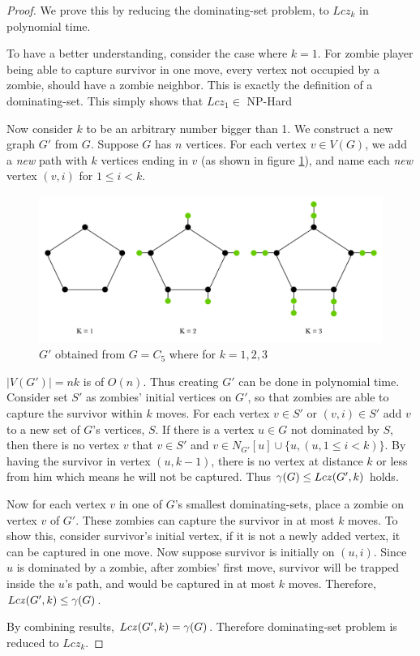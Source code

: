 \documentclass[1p]{elsarticle}
\newcommand{\zn}{\ooalign{$z$\cr\hfil\rule[.5ex]{.2em}{.08ex}\hfil\cr}}
\begin{document}
	\begin{proof}
		We prove this by reducing the dominating-set problem, to $Lcz_k$ in polynomial time.

		To have a better understanding, consider the case where $k=1$. For zombie player being able to capture survivor in
		one move, every vertex not occupied by a zombie, should have a zombie neighbor. This is exactly the definition
		of a dominating-set. This simply shows that $Lcz_1 \in$ NP-Hard 

		Now consider $k$ to be an arbitrary number bigger than 1. We construct a new graph $G'$ from $G$. Suppose $G$
		has $n$ vertices. For each vertex $v \in V(G)$, we add a {\it new} path with $k$ vertices ending in $v$ (as
		shown in figure \ref{fig:p7}), and name each {\it new} vertex $(v,i)$ for $1 \leq i < k$. 

		\begin{figure}[h!]
			\centering
			\includegraphics[width=0.9\linewidth]{fig/LCZ.png}
			\caption{$G'$ obtained from $G = C_5$ where for $k = 1,2,3$}
			\label{fig:p7}
		\end{figure}		


		$|V(G')| = nk$ is of $O(n)$. Thus creating $G'$ can be done in polynomial time. Consider set $S'$ as zombies'
		initial vertices on $G'$, so that zombies are able to capture the survivor within $k$ moves. For each vertex $v \in
		S'$ or $(v,i) \in S'$ add $v$ to a new set of $G$'s vertices, $S$. If there is a vertex $u \in G$ not dominated by
		$S$, then there is no vertex $v$ that $v \in S'$ and $v \in N_{G'}[u] \cup \{u, (u,1 \leq i < k)\}$. By having
		the survivor in vertex $(u, k-1)$, there is no vertex at distance $k$ or less from him which means he will not
		be captured. Thus $\gamma(G) \leq Lc\zn(G',k)$ holds.
		
		Now for each vertex $v$ in one of $G$'s smallest dominating-sets, place a zombie on vertex $v$ of $G'$. These
		zombies can capture the survivor in at most $k$ moves. To show this, consider survivor's initial vertex, if it
		is not a newly added vertex, it can be captured in one move. Now suppose survivor is initially on $(u,i)$. Since
		$u$ is dominated by a zombie, after zombies' first move, survivor will be trapped inside the $u$'s path, and would
		be captured in at most $k$ moves. Therefore, $Lc\zn(G',k) \leq \gamma(G)$.

		By combining results, $Lc\zn(G',k) = \gamma(G)$. Therefore dominating-set problem is reduced to $Lcz_k$.

	\end{proof}
\end{document}
